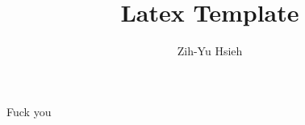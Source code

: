 \documentclass{article}
\title{Latex Template}
\author{Zih-Yu Hsieh}
\begin{document}
\maketitle

Fuck you
\end{document}
